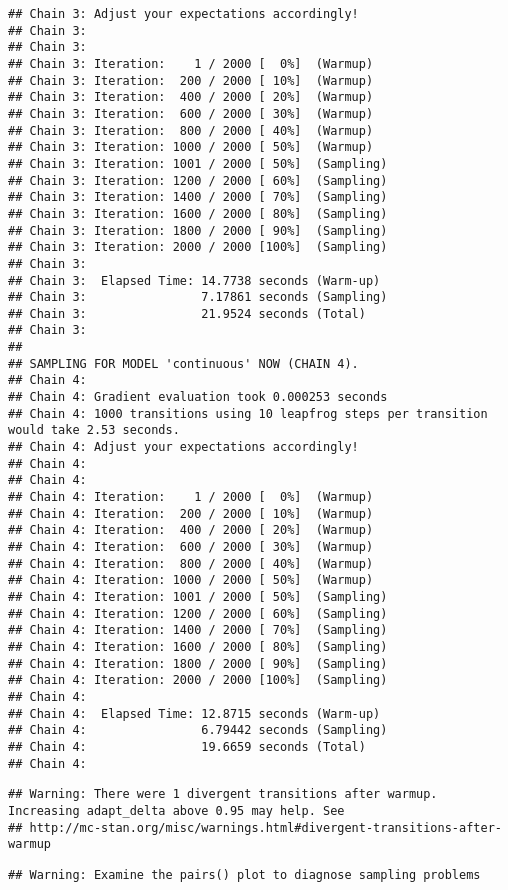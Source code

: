 \documentclass[]{article}
\begin{document}
\begin{verbatim}
## Chain 3: Adjust your expectations accordingly!
## Chain 3: 
## Chain 3: 
## Chain 3: Iteration:    1 / 2000 [  0%]  (Warmup)
## Chain 3: Iteration:  200 / 2000 [ 10%]  (Warmup)
## Chain 3: Iteration:  400 / 2000 [ 20%]  (Warmup)
## Chain 3: Iteration:  600 / 2000 [ 30%]  (Warmup)
## Chain 3: Iteration:  800 / 2000 [ 40%]  (Warmup)
## Chain 3: Iteration: 1000 / 2000 [ 50%]  (Warmup)
## Chain 3: Iteration: 1001 / 2000 [ 50%]  (Sampling)
## Chain 3: Iteration: 1200 / 2000 [ 60%]  (Sampling)
## Chain 3: Iteration: 1400 / 2000 [ 70%]  (Sampling)
## Chain 3: Iteration: 1600 / 2000 [ 80%]  (Sampling)
## Chain 3: Iteration: 1800 / 2000 [ 90%]  (Sampling)
## Chain 3: Iteration: 2000 / 2000 [100%]  (Sampling)
## Chain 3: 
## Chain 3:  Elapsed Time: 14.7738 seconds (Warm-up)
## Chain 3:                7.17861 seconds (Sampling)
## Chain 3:                21.9524 seconds (Total)
## Chain 3: 
## 
## SAMPLING FOR MODEL 'continuous' NOW (CHAIN 4).
## Chain 4: 
## Chain 4: Gradient evaluation took 0.000253 seconds
## Chain 4: 1000 transitions using 10 leapfrog steps per transition would take 2.53 seconds.
## Chain 4: Adjust your expectations accordingly!
## Chain 4: 
## Chain 4: 
## Chain 4: Iteration:    1 / 2000 [  0%]  (Warmup)
## Chain 4: Iteration:  200 / 2000 [ 10%]  (Warmup)
## Chain 4: Iteration:  400 / 2000 [ 20%]  (Warmup)
## Chain 4: Iteration:  600 / 2000 [ 30%]  (Warmup)
## Chain 4: Iteration:  800 / 2000 [ 40%]  (Warmup)
## Chain 4: Iteration: 1000 / 2000 [ 50%]  (Warmup)
## Chain 4: Iteration: 1001 / 2000 [ 50%]  (Sampling)
## Chain 4: Iteration: 1200 / 2000 [ 60%]  (Sampling)
## Chain 4: Iteration: 1400 / 2000 [ 70%]  (Sampling)
## Chain 4: Iteration: 1600 / 2000 [ 80%]  (Sampling)
## Chain 4: Iteration: 1800 / 2000 [ 90%]  (Sampling)
## Chain 4: Iteration: 2000 / 2000 [100%]  (Sampling)
## Chain 4: 
## Chain 4:  Elapsed Time: 12.8715 seconds (Warm-up)
## Chain 4:                6.79442 seconds (Sampling)
## Chain 4:                19.6659 seconds (Total)
## Chain 4:
\end{verbatim}

\begin{verbatim}
## Warning: There were 1 divergent transitions after warmup. Increasing adapt_delta above 0.95 may help. See
## http://mc-stan.org/misc/warnings.html#divergent-transitions-after-warmup
\end{verbatim}

\begin{verbatim}
## Warning: Examine the pairs() plot to diagnose sampling problems
\end{verbatim}
\end{document}
